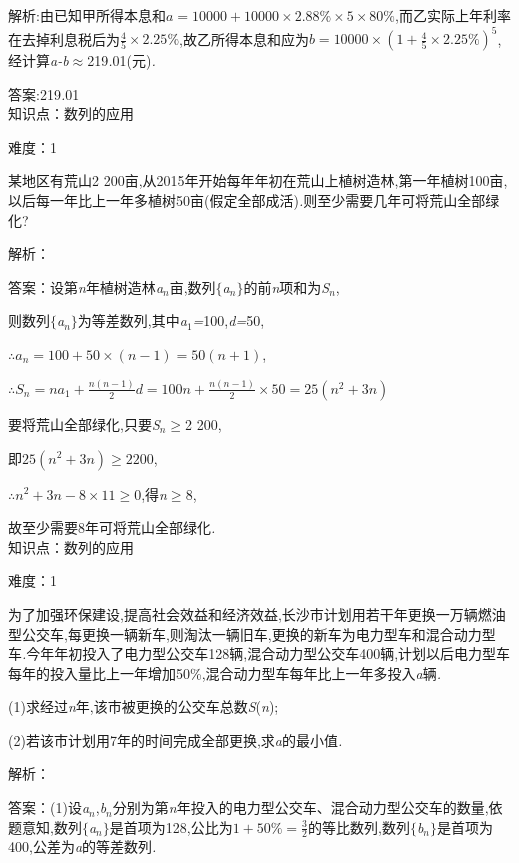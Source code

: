 \documentclass{article} %
\begin{document}
 解析:由已知甲所得本息和$a=10000+10000\times 2.88\%\times 5\times 80\%$,而乙实际上年利率在去掉利息税后为$\frac{4}{5}\times 2.25\%$,故乙所得本息和应为$b=10000\times (1+\frac{4}{5}\times 2.25\%)^5$,经计算\textit{a-b}$\mathrm{\approx}$219\textit{.}01(元)\textit{.}

 答案:219\textit{.}01 \\

知识点：数列的应用

难度：1

 某地区有荒山2 200亩,从2015年开始每年年初在荒山上植树造林,第一年植树100亩,以后每一年比上一年多植树50亩(假定全部成活)\textit{.}则至少需要几年可将荒山全部绿化?

解析：

 答案：设第\textit{n}年植树造林\textit{a${}_{n}$}亩,数列$\mathrm{\{}$\textit{a${}_{n}$}$\mathrm{\}}$的前\textit{n}项和为\textit{S${}_{n}$},

则数列$\mathrm{\{}$\textit{a${}_{n}$}$\mathrm{\}}$为等差数列,其中\textit{a}${}_{1}$\textit{=}100,\textit{d=}50,

$\therefore a_n=100+50\times (n-1)=50(n+1)$,

$\therefore S_n=na_1+\frac{n(n-1)}{2}d=100n+\frac{n(n-1)}{2}\times 50=25(n^2+3n)$

要将荒山全部绿化,只要\textit{S${}_{n}$}$\mathrm{\ge}$2 200,

即$25(n^2+3n)\ge 2200$,

$\therefore n^2+3n-8\times 11\ge 0$,得\textit{n}$\mathrm{\ge}$8,

故至少需要8年可将荒山全部绿化\textit{.} \\

知识点：数列的应用

难度：1

 为了加强环保建设,提高社会效益和经济效益,长沙市计划用若干年更换一万辆燃油型公交车,每更换一辆新车,则淘汰一辆旧车,更换的新车为电力型车和混合动力型车\textit{.}今年年初投入了电力型公交车128辆,混合动力型公交车400辆,计划以后电力型车每年的投入量比上一年增加50\%,混合动力型车每年比上一年多投入\textit{a}辆\textit{.}

 (1)求经过\textit{n}年,该市被更换的公交车总数\textit{S}(\textit{n});

 (2)若该市计划用7年的时间完成全部更换,求\textit{a}的最小值\textit{.}

解析：

 答案：(1)设\textit{a${}_{n}$},\textit{b${}_{n}$}分别为第\textit{n}年投入的电力型公交车、混合动力型公交车的数量,依题意知,数列$\mathrm{\{}$\textit{a${}_{n}$}$\mathrm{\}}$是首项为128,公比为$1+50\%=\frac{3}{2}$的等比数列,数列$\mathrm{\{}$\textit{b${}_{n}$}$\mathrm{\}}$是首项为400,公差为\textit{a}的等差数列\textit{.}
\end{document}
